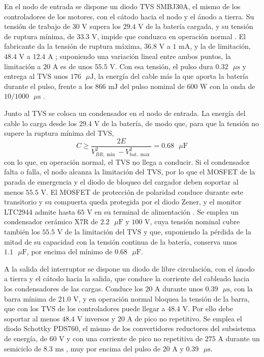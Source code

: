 \documentclass[../../General.tex]{subfiles}
\begin{document}
En el nodo de entrada se dispone un diodo TVS SMBJ30A, el mismo de los controladores de los motores, con el cátodo hacia el nodo y el ánodo a tierra. Su tensión de trabajo de $30\text{ V}$ supera los $29.4\text{ V}$ de la batería cargada, y su tensión de ruptura mínima, de $33.3\text{ V}$, impide que conduzca en operación normal \citep{vishay_smbj}. El fabricante da la tensión de ruptura máxima, $36.8\text{ V}$ a $1\text{ mA}$, y la de limitación, $48.4\text{ V}$ a $12.4\text{ A}$ \citep{vishay_smbj}; suponiendo una variación lineal entre ambos puntos, la limitación a $20\text{ A}$ es de unos $55.5\text{ V}$. Con esa tensión, el pulso dura $0.32\text{ }\mu\text{s}$ y entrega al TVS unos $176\text{ }\mu\text{J}$, la energía del cable más la que aporta la batería durante el pulso, frente a los $866\text{ mJ}$ del pulso nominal de $600\text{ W}$ con la onda de $10/1000\text{ }\mu\text{s}$ \citep{vishay_smbj}.

Junto al TVS se coloca un condensador en el nodo de entrada. La energía del cable lo carga desde los $29.4\text{ V}$ de la batería, de modo que, para que la tensión no supere la ruptura mínima del TVS,
\begin{equation}
C \geq \frac{2E}{V_{BR,\min}^2 - V_{\text{bat},\max}^2} = 0.68\text{ }\mu\text{F}
\end{equation}
con lo que, en operación normal, el TVS no llega a conducir. Si el condensador falta o falla, el nodo alcanza la limitación del TVS, por lo que el MOSFET de la parada de emergencia y el diodo de bloqueo del cargador deben soportar al menos $55.5\text{ V}$. El MOSFET de protección de polaridad conduce durante este transitorio y su compuerta queda protegida por el diodo Zener, y el monitor LTC2944 admite hasta $65\text{ V}$ en su terminal de alimentación \citep{adi_ltc2944}.
Se emplea un condensador cerámico X7R de $2.2\text{ }\mu\text{F}$ y $100\text{ V}$, cuya tensión nominal cubre también los $55.5\text{ V}$ de la limitación del TVS y que, suponiendo la pérdida de la mitad de su capacidad con la tensión continua de la batería, conserva unos $1.1\text{ }\mu\text{F}$, por encima del mínimo de $0.68\text{ }\mu\text{F}$.

A la salida del interruptor se dispone un diodo de libre circulación, con el ánodo a tierra y el cátodo hacia la salida, que conduce la corriente del cableado hacia los condensadores de las cargas. Conduce los $20\text{ A}$ durante unos $0.39\text{ }\mu\text{s}$, con la barra mínima de $21.0\text{ V}$, y en operación normal bloquea la tensión de la barra, que con los TVS de los controladores puede llegar a $48.4\text{ V}$. Por ello debe soportar al menos $48.4\text{ V}$ inversos y $20\text{ A}$ de pico no repetitivo. Se emplea el diodo Schottky PDS760, el mismo de los convertidores reductores del subsistema de energía, de $60\text{ V}$ y con una corriente de pico no repetitiva de $275\text{ A}$ durante un semiciclo de $8.3\text{ ms}$ \citep{diodes_pds760}, muy por encima del pulso de $20\text{ A}$ y $0.39\text{ }\mu\text{s}$.
\end{document}
